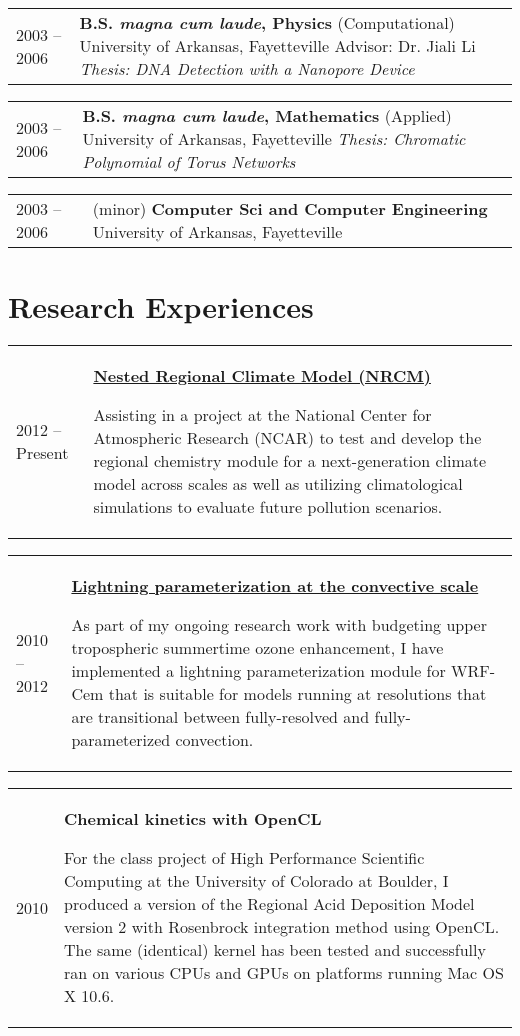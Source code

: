 \documentclass[overlap,12pt,centered]{res}
\makeatletter
\newcommand{\tabulated}{\begin{tabular}{@{}p{1.4in}p{4.9in}}}
\makeatother
\begin{document}
\begin{resume}
		\tabulated						
			2003 -- 2006	& {\bf B.S. {\it magna cum laude}, Physics} (Computational) \newline
						University of Arkansas, Fayetteville \newline
						{Advisor: Dr. Jiali Li} \newline
						{\it Thesis: DNA Detection with a Nanopore Device}
		\end{tabular}
		
		\tabulated						
			2003 -- 2006	& {\bf B.S. {\it magna cum laude},  Mathematics} (Applied) \newline
						University of Arkansas, Fayetteville \newline
						{\it Thesis: Chromatic Polynomial of Torus Networks}
		\end{tabular}
		
		\tabulated						
			2003 -- 2006	&  (minor) {\bf Computer Sci and Computer Engineering} \newline
						University of Arkansas, Fayetteville
		\end{tabular}

		\section{\sc Research Experiences}		
		\tabulated
			2012 -- Present	&	\href{http://www.nrcm.ucar.edu}{\bf Nested Regional Climate Model (NRCM)}
				
				Assisting in a project at the National Center for Atmospheric Research (NCAR) to test and develop the regional chemistry module for a next-generation climate model across scales as well as utilizing climatological simulations to evaluate future pollution scenarios.
		\end{tabular}
		
		\tabulated
			2010 -- 2012	&	\href{http://www.geosci-model-dev.net/6/429/2013/gmd-6-429-2013.html}{\bf Lightning parameterization at the convective scale}
				
				As part of my ongoing research work with budgeting upper tropospheric summertime ozone enhancement, I have implemented a lightning parameterization module for WRF-Cem that is suitable for models running at resolutions that are transitional between fully-resolved and fully-parameterized convection.
		\end{tabular}
		
		\tabulated
			2010			&	{\bf Chemical kinetics with OpenCL}
				
				For the class project of High Performance Scientific Computing at the University of Colorado at Boulder, I produced a version of the Regional Acid Deposition Model version 2 with Rosenbrock integration method using OpenCL. The same (identical) kernel has been tested and successfully ran on  various CPUs and GPUs on platforms running Mac OS X 10.6.
		\end{tabular}


\end{resume}
\end{document}
